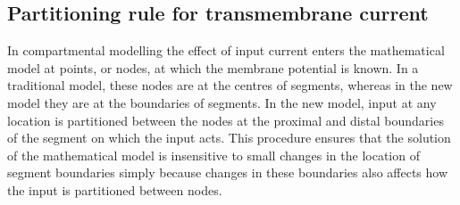 \subsection{Partitioning rule for transmembrane current}
In compartmental modelling the effect of input current enters the
mathematical model at points, or nodes, at which the membrane
potential is known. In a traditional model, these nodes are at the
centres of segments, whereas in the new model they are at the
boundaries of segments. In the new model, input at any location is
partitioned between the nodes at the proximal and distal
boundaries of the segment on which the input acts. This procedure
ensures that the solution of the mathematical model is insensitive
to small changes in the location of segment boundaries simply
because changes in these boundaries also affects how the input is
partitioned between nodes.

